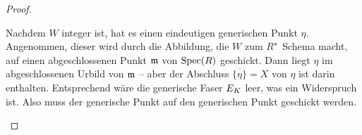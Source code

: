 \begin{Lemma}
\begin{proof}
\begin{description}
      Nachdem $W$ integer ist, hat es einen eindeutigen generischen
      Punkt $\eta$.
      Angenommen, dieser wird durch die Abbildung, die $W$ zum
      $R$"~Schema macht, auf einen abgeschlossenen Punkt $\mathfrak{m}$ von $\operatorname{Spec}(R)$
      geschickt.
      Dann liegt $\eta$ im abgeschlossenen Urbild von $\mathfrak{m}$ –
      aber der Abschluss $\overline{\{\eta\}}=X$ von $\eta$ ist darin
      enthalten. Entsprechend wäre die generische Faser $E_{K}$
      leer, was ein Widerspruch ist.
      Also muss der generische Punkt auf den generischen Punkt geschickt
      werden.
      \qedhere
    \end{description}
  \end{proof}
\end{Lemma}






